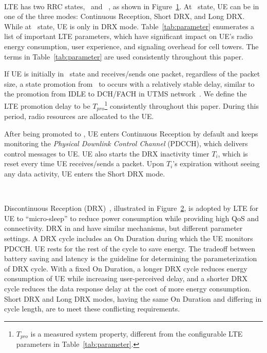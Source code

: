 \begin{figure}[t]
\centering
{} \\
\label{fig:sm}
\end{figure}

LTE has two RRC states, \RC~and \RI~\cite{tr25.813, ts36.331}, as shown in Figure~\ref{fig:sm}. At \RC~state, UE can be in one of the three modes: Continuous Reception, Short DRX, and Long DRX. While at \RI~state, UE is only in DRX mode. Table~\ref{tab:parameter} enumerates a list of important LTE parameters, which have significant impact on UE's radio energy consumption, user experience, and signaling overhead for cell towers. The terms in Table~\ref{tab:parameter} are used consistently throughout this paper.



If UE is initially in \RI~state and receives/sends one packet, regardless of the packet size, a state promotion from \RI~to \RC occurs with a relatively stable delay, similar to the promotion from IDLE to DCH/FACH in UTMS network~\cite{imc.3g}. We define the LTE promotion delay to be $T_{pro}$\footnote{$T_{pro}$ is a measured system property, different from the configurable LTE parameters in Table~\ref{tab:parameter}.} consistently throughout this paper. During this period, radio resources are allocated to the UE.  

After being promoted to \RC, UE enters Continuous Reception by default and keeps monitoring the {\em Physical Downlink Control Channel} (PDCCH), which delivers control messages to UE. UE also starts the DRX inactivity timer $T_i$, which is reset every time UE receives/sends a packet. Upon $T_i$'s expiration without seeing any data activity, UE enters the Short DRX mode.

\begin{figure}[t]
\centering
{} \\
\label{fig:drx}
\end{figure}

Discontinuous Reception (DRX)~\cite{ts36.321, 4gbook}, illustrated in Figure~\ref{fig:drx}, is adopted by LTE for UE to ``micro-sleep'' to reduce power consumption while providing high QoS and connectivity. DRX in \RC and \RI have similar mechanisms, but different parameter settings. A DRX cycle includes an On Duration during which the UE monitors PDCCH. UE rests for the rest of the cycle to save energy. The tradeoff between battery saving and latency is the guideline for determining the parameterization of DRX cycle. With a fixed On Duration, a longer DRX cycle reduces energy consumption of UE while increasing user-perceived delay, and a shorter DRX cycle reduces the data response delay at the cost of more energy consumption. Short DRX and Long DRX modes, having the same On Duration and differing in cycle length, are to meet these conflicting requirements.

